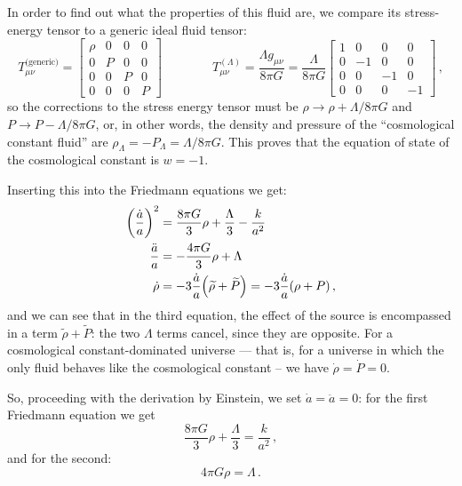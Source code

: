 \documentclass[main.tex]{subfiles}
\begin{document}
In order to find out what the properties of this fluid are, we compare its stress-energy tensor to a generic ideal fluid tensor: 
%
\begin{equation}
T_{\mu \nu }^{\text{(generic)}} = \left[\begin{array}{cccc}
\rho & 0 & 0 & 0 \\ 
0 & P & 0 & 0 \\ 
0 & 0 & P & 0 \\ 
0 & 0 & 0 & P
\end{array}\right]
\qquad \qquad
T^{(\Lambda )}_{\mu \nu } = \frac{\Lambda g_{\mu \nu }}{8 \pi G} = \frac{\Lambda}{8 \pi G} \left[\begin{array}{cccc}
1 & 0 & 0 & 0 \\ 
0 & -1 & 0 & 0 \\ 
0 & 0 & -1 & 0 \\ 
0 & 0 & 0 & -1
\end{array}\right]
\,,
\end{equation}
%
so the corrections to the stress energy tensor must be \(\rho \rightarrow \rho + \Lambda/ 8 \pi G \) and \(P \rightarrow P - \Lambda  / 8 \pi G\), or, in other words, the density and pressure of the ``cosmological constant fluid'' are \(\rho_{\Lambda } = - P_{\Lambda } = \Lambda/8\pi G\).
This proves that the equation of state of the cosmological constant is \(w = -1\).

Inserting this into the Friedmann equations we get: 
%
\begin{align}
  \qty(\frac{\dot{a} }{a})^2 &= 
  \frac{8 \pi G}{3} \rho + \frac{\Lambda }{3}
  - \frac{k}{a^2} \label{eq:friedmann-1-cosmological-constant}\\
  \frac{\ddot{a}}{a}  &= - \frac{4 \pi G}{3} \rho + \Lambda \label{eq:friedmann-2-cosmological-constant}\\
 \dot{\rho} &= -3 \frac{\dot{a}}{a }\qty(\widetilde{\rho} + \widetilde{P}) = -3 \frac{\dot{a}}{a} \qty(\rho + P)\label{eq:friedmann-3-cosmological-constant}
\,,
\end{align}
%
and we can see that in the third equation, the effect of the source is encompassed in a term \(\widetilde{\rho }  + \widetilde{P} \): the two \(\Lambda \) terms cancel, since they are opposite.
For a cosmological constant-dominated universe --- that is, for a universe in which the only fluid behaves like the cosmological constant -- we have \(\dot{\rho} = \dot{P} = 0\). 

So, proceeding with the derivation by Einstein, we set \(\dot{a}= \ddot{a} =0 \): for the first Friedmann equation we get 
%
\begin{equation}
  \frac{8 \pi G}{3} \rho + \frac{\Lambda}{3} = \frac{k}{a^2}
\,,
\end{equation}
%
and for the second: 
%
\begin{equation}
  4 \pi G \rho = \Lambda 
\,.
\end{equation}
\end{document}
